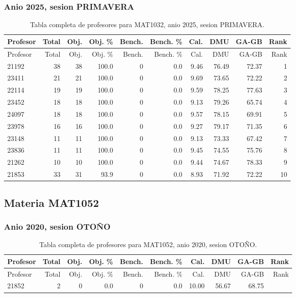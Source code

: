 \subsubsection{Anio 2025, sesion PRIMAVERA}

\begingroup
\scriptsize
\setlength{\tabcolsep}{3pt}
\begin{longtable}{lrrrrrrrrr}
\caption{Tabla completa de profesores para MAT1032, anio 2025, sesion PRIMAVERA.}\label{tab:prof-period-mat1032-2025-primavera}\\
\toprule
Profesor & Total & Obj. & Obj. \% & Bench. & Bench. \% & Cal. & DMU & GA-GB & Rank \\
\midrule
\endfirsthead
\toprule
Profesor & Total & Obj. & Obj. \% & Bench. & Bench. \% & Cal. & DMU & GA-GB & Rank \\
\midrule
\endhead
21192 & 38 & 38 & 100.0 & 0 & 0.0 & 9.46 & 76.49 & 72.37 & 1 \\
23411 & 21 & 21 & 100.0 & 0 & 0.0 & 9.69 & 73.65 & 72.22 & 2 \\
22114 & 19 & 19 & 100.0 & 0 & 0.0 & 9.59 & 78.25 & 77.63 & 3 \\
23452 & 18 & 18 & 100.0 & 0 & 0.0 & 9.13 & 79.26 & 65.74 & 4 \\
24097 & 18 & 18 & 100.0 & 0 & 0.0 & 9.57 & 78.15 & 69.91 & 5 \\
23978 & 16 & 16 & 100.0 & 0 & 0.0 & 9.27 & 79.17 & 71.35 & 6 \\
23148 & 11 & 11 & 100.0 & 0 & 0.0 & 9.13 & 73.33 & 67.42 & 7 \\
23836 & 11 & 11 & 100.0 & 0 & 0.0 & 9.45 & 74.55 & 75.76 & 8 \\
21262 & 10 & 10 & 100.0 & 0 & 0.0 & 9.44 & 74.67 & 78.33 & 9 \\
21853 & 33 & 31 & 93.9 & 0 & 0.0 & 8.93 & 71.92 & 72.22 & 10 \\
\bottomrule
\end{longtable}
\endgroup

\subsection{Materia MAT1052}

\subsubsection{Anio 2020, sesion OTOÑO}

\begingroup
\scriptsize
\setlength{\tabcolsep}{3pt}
\begin{longtable}{lrrrrrrrrr}
\caption{Tabla completa de profesores para MAT1052, anio 2020, sesion OTOÑO.}\label{tab:prof-period-mat1052-2020-oto-o}\\
\toprule
Profesor & Total & Obj. & Obj. \% & Bench. & Bench. \% & Cal. & DMU & GA-GB & Rank \\
\midrule
\endfirsthead
\toprule
Profesor & Total & Obj. & Obj. \% & Bench. & Bench. \% & Cal. & DMU & GA-GB & Rank \\
\midrule
\endhead
21852 & 2 & 0 & 0.0 & 0 & 0.0 & 10.00 & 56.67 & 68.75 &  \\
\bottomrule
\end{longtable}
\endgroup

